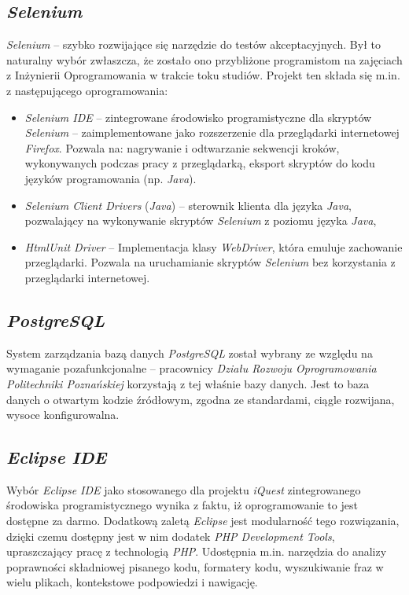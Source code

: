 \subsection{\textit{Selenium}}
\label{Chapter634}

\textit{Selenium} -- szybko rozwijające się narzędzie do testów akceptacyjnych. Był to naturalny wybór zwłaszcza, że zostało ono przybliżone programistom na zajęciach z Inżynierii Oprogramowania w trakcie toku studiów. Projekt ten składa się m.in. z następującego oprogramowania:
\begin{itemize}
\item{\textit{Selenium IDE} -- zintegrowane środowisko programistyczne dla skryptów \textit{Selenium} -- zaimplementowane jako rozszerzenie dla przeglądarki internetowej \textit{Firefox}. Pozwala na: nagrywanie i odtwarzanie sekwencji kroków, wykonywanych podczas pracy z przeglądarką, eksport skryptów do kodu języków programowania (np. \textit{Java}).}
\item{\textit{Selenium Client Drivers} (\textit{Java}) -- sterownik klienta dla języka \textit{Java}, pozwalający na wykonywanie skryptów \textit{Selenium} z poziomu języka \textit{Java}},
\item{\textit{HtmlUnit Driver} -- Implementacja klasy \textit{WebDriver}, która emuluje zachowanie przeglądarki. Pozwala na uruchamianie skryptów \textit{Selenium} bez korzystania z przeglądarki internetowej.}
\end{itemize}

\subsection{\textit{PostgreSQL}}
\label{Chapter635}

System zarządzania bazą danych \textit{PostgreSQL} został wybrany ze względu na wymaganie pozafunkcjonalne -- pracownicy \textit{Działu Rozwoju Oprogramowania Politechniki Poznańskiej} korzystają z tej właśnie bazy danych. Jest to baza danych o otwartym kodzie źródłowym, zgodna ze standardami, ciągle rozwijana, wysoce konfigurowalna.

\subsection{\textit{Eclipse IDE}}
\label{Chapter636}

Wybór \textit{Eclipse IDE} jako stosowanego dla projektu \textit{iQuest} zintegrowanego środowiska programistycznego wynika z faktu, iż oprogramowanie to jest dostępne za darmo. Dodatkową zaletą \textit{Eclipse} jest modularność tego rozwiązania, dzięki czemu dostępny jest w nim dodatek \textit{PHP Development Tools}, upraszczający pracę z technologią \textit{PHP}. Udostępnia m.in. narzędzia do analizy poprawności składniowej pisanego kodu, formatery kodu, wyszukiwanie fraz w wielu plikach, kontekstowe podpowiedzi i nawigację.

